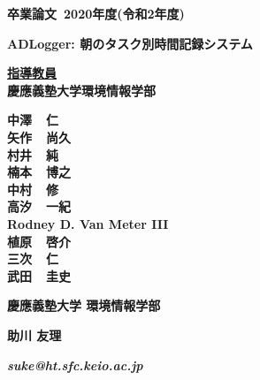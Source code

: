 \pagestyle{empty}

\begin{center}

\vspace{5cm}

\textbf{\Large 卒業論文~2020年度(令和2年度)}

\vspace{2cm}

\textbf{\LARGE ADLogger: 朝のタスク別時間記録システム}

\vspace{3cm}

\textbf{\underline{\large 指導教員}}\\
\textbf{慶應義塾大学環境情報学部}

\textbf{\Large 中澤~~仁}\\
\textbf{\Large 矢作~~尚久}\\
\textbf{\Large 村井~~純}\\
\textbf{\Large 楠本~~博之}\\
\textbf{\Large 中村~~修}\\
\textbf{\Large 高汐~~一紀}\\
\textbf{\Large Rodney D. Van Meter III}\\
\textbf{\Large 植原~~啓介}\\
\textbf{\Large 三次~~仁}\\
\textbf{\Large 武田~~圭史}\\

\vspace{6cm}

\textbf{\LARGE 慶應義塾大学 環境情報学部}

\vspace{.5em}

\textbf{\LARGE 助川 友理}

\vspace{.3em}

\textbf{\it suke@ht.sfc.keio.ac.jp}



\newpage

\end{center}

\pagestyle{plain}
